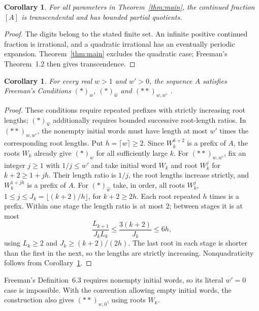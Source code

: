 \documentclass[11pt]{article}
\newtheorem{corollary}[theorem]{Corollary}
\begin{document}
\begin{corollary}\label{cor:transcendence}
For all parameters in Theorem~\ref{thm:main}, the continued fraction $[A]$ is transcendental
and has bounded partial quotients.
\end{corollary}
\begin{proof}
The digits belong to the stated finite set. An infinite positive continued
fraction is irrational, and a quadratic irrational has an eventually periodic
expansion. Theorem~\ref{thm:main} excludes the quadratic case; Freeman's
Theorem~1.2 \cite{Freeman} then gives transcendence.
\end{proof}

\begin{corollary}\label{cor:repetition}
For every real $w>1$ and $w'>0$, the sequence $A$ satisfies Freeman's Conditions
$(*)_w$, $(*)_{\widehat w}$ and $(**)_{w,w'}$
\cite[Definitions~6.1--6.3, p.~7]{Freeman}.
\end{corollary}
\begin{proof}
These conditions require repeated prefixes with strictly increasing root
lengths; $(*)_{\widehat w}$ additionally requires bounded successive
root-length ratios. In $(**)_{w,w'}$, the nonempty initial words must have
length at most $w'$ times the corresponding root lengths.
Put $h=\lceil w\rceil\geq2$. Since $W_k^{k+2}$ is a prefix of $A$,
the roots $W_k$ already give $(*)_w$ for all sufficiently large $k$.
For $(**)_{w,w'}$, fix an integer $j\geq1$ with $1/j\leq w'$ and take
initial word $W_k$ and root $W_k^j$ for $k+2\geq1+jh$.
Their length ratio is $1/j$, the root lengths increase strictly, and
$W_k^{1+jh}$ is a prefix of $A$.
For $(*)_{\widehat w}$ take, in order, all roots
$W_k^j$, $1\leq j\leq J_k=\lfloor(k+2)/h\rfloor$, for $k+2\geq2h$.
Each root repeated $h$ times is a prefix. Within one stage the length
ratio is at most $2$; between stages it is at most
\[
 \frac{L_{k+1}}{J_kL_k}
 \leq\frac{3(k+2)}{J_k}\leq6h,
\]
using $L_k\geq2$ and $J_k\geq(k+2)/(2h)$.
The last root in each stage is shorter than the first in the next, so
the lengths are strictly increasing. Nonquadraticity follows from
Corollary~\ref{cor:transcendence}.
\end{proof}

Freeman's Definition~6.3 requires nonempty initial words, so its literal
$w'=0$ case is impossible. With the convention allowing empty initial
words, the construction also gives $(**)_{w,0}$, using roots $W_k$.
\end{document}
